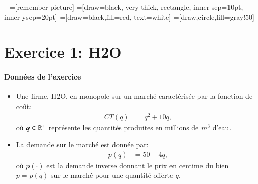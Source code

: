 


\usetikzlibrary{positioning}
\usetikzlibrary{snakes}
\usetikzlibrary{calc}
\usetikzlibrary{arrows}
\usetikzlibrary{decorations.markings}
\usetikzlibrary{shapes.misc}
\usetikzlibrary{matrix,shapes,arrows,fit,tikzmark}
\usetikzlibrary{matrix,chains,positioning,decorations.pathreplacing,arrows}
\usetikzlibrary{shapes}
\usetikzlibrary{shapes.geometric, arrows}
\newcommand\marktopleft[1]{
    \tikz[overlay,remember picture] 
        \node (marker-#1-a) at (-.3em,.3em) {};%
}
\newcommand\markbottomright[2]{%
    \tikz[overlay,remember picture] 
        \node (marker-#1-b) at (0em,0em) {};%
}
+=[remember picture] 
 =[draw=black, very thick, rectangle, inner sep=10pt, inner ysep=20pt]
 =[draw=black,fill=red, text=white]
=[draw,circle,fill=gray!50]

\begin{frame}
\titlepage
\end{frame}
\begin{frame}
 \tableofcontents
    \end{frame}

\section{Exercice 1: H2O}
\frame{\sectionpage}
\begin{frame}
[allowframebreaks]{\insertsection}
\framesubtitle{Données de l'exercice}
\begin{itemize}
\item Une firme, H2O, en monopole sur un marché caractérisée par la fonction de coût: 
\begin{align}
CT(q) &= q^2 + 10q,
\label{eq1}
\end{align}
où $q\in \mathbb{R}^+$ représente les quantités produites en millions de $m^3$ d’eau.
\item La demande sur le marché est donnée par:
\begin{align}
p(q) &= 50-4q,
\label{eq2}
\end{align}
où $p(\cdot)$ est la demande inverse donnant le prix  en centime du bien $p=p(q)$  sur le marché pour une quantité offerte $q$.
\end{itemize}
\end{frame}

